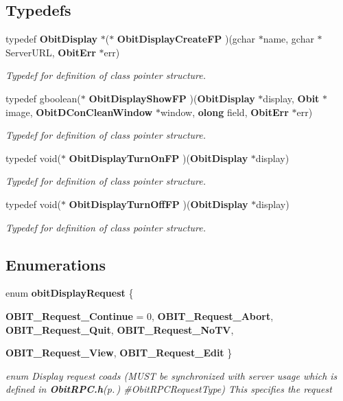\subsection*{Typedefs}
\begin{CompactItemize}
\item 
typedef {\bf Obit\-Display} $\ast$($\ast$ {\bf Obit\-Display\-Create\-FP} )(gchar $\ast$name, gchar $\ast$Server\-URL, {\bf Obit\-Err} $\ast$err)
\begin{CompactList}\small\item\em Typedef for definition of class pointer structure. \item\end{CompactList}\item 
typedef gboolean($\ast$ {\bf Obit\-Display\-Show\-FP} )({\bf Obit\-Display} $\ast$display, {\bf Obit} $\ast$image, {\bf Obit\-DCon\-Clean\-Window} $\ast$window, {\bf olong} field, {\bf Obit\-Err} $\ast$err)
\begin{CompactList}\small\item\em Typedef for definition of class pointer structure. \item\end{CompactList}\item 
typedef void($\ast$ {\bf Obit\-Display\-Turn\-On\-FP} )({\bf Obit\-Display} $\ast$display)
\begin{CompactList}\small\item\em Typedef for definition of class pointer structure. \item\end{CompactList}\item 
typedef void($\ast$ {\bf Obit\-Display\-Turn\-Off\-FP} )({\bf Obit\-Display} $\ast$display)
\begin{CompactList}\small\item\em Typedef for definition of class pointer structure. \item\end{CompactList}\end{CompactItemize}
\subsection*{Enumerations}
\begin{CompactItemize}
\item 
enum {\bf obit\-Display\-Request} \{ \par
{\bf OBIT\_\-Request\_\-Continue} =  0, 
{\bf OBIT\_\-Request\_\-Abort}, 
{\bf OBIT\_\-Request\_\-Quit}, 
{\bf OBIT\_\-Request\_\-No\-TV}, 
\par
{\bf OBIT\_\-Request\_\-View}, 
{\bf OBIT\_\-Request\_\-Edit}
 \}
\begin{CompactList}\small\item\em enum Display request coads (MUST be synchronized with server usage which is defined in {\bf Obit\-RPC.h}{\rm (p.\,\pageref{ObitRPC_8h})} \#Obit\-RPCRequest\-Type) This specifies the request \item\end{CompactList}\end{CompactItemize}

